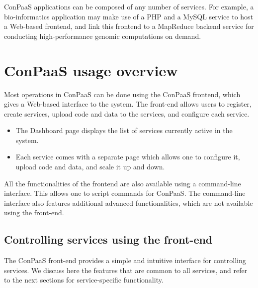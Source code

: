 \documentclass[10pt]{article}
\begin{document}
ConPaaS applications can be composed of any number of services. For
example, a bio-informatics application may make use of a PHP and a
MySQL service to host a Web-based frontend, and link this frontend to
a MapReduce backend service for conducting high-performance genomic
computations on demand.

\section{ConPaaS usage overview}

Most operations in ConPaaS can be done using the ConPaaS frontend,
which gives a Web-based interface to the system. The front-end allows
users to register, create services, upload code and data to the
services, and configure each service. 

\begin{itemize}
\item The Dashboard page displays the list of services currently
  active in the system. 
\item Each service comes with a separate page which allows one to
  configure it, upload code and data, and scale it up and down.
\end{itemize}

All the functionalities of the frontend are also available using a
command-line interface. This allows one to script commands for
ConPaaS. The command-line interface also features additional advanced
functionalities, which are not available using the front-end.

\subsection{Controlling services using the front-end}

The ConPaaS front-end provides a simple and intuitive interface for
controlling services. We discuss here the features that are common to
all services, and refer to the next sections for service-specific
functionality.
\end{document}
